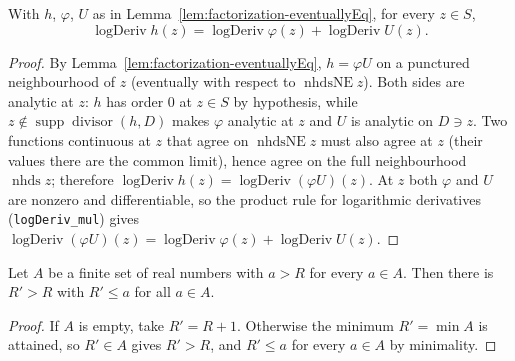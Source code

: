 \begin{lemma}
    \label{lem:factorization-logDeriv}
    \leanok
    With $h$, $\varphi$, $U$ as in
    Lemma~\ref{lem:factorization-eventuallyEq}, for every $z \in S$,
    \[
        \operatorname{logDeriv} h(z)
          = \operatorname{logDeriv}\varphi(z) + \operatorname{logDeriv} U(z).
    \]
\end{lemma}
\begin{proof}
    By Lemma~\ref{lem:factorization-eventuallyEq}, $h = \varphi U$ on a punctured
    neighbourhood of $z$ (eventually with respect to $\operatorname{nhdsNE} z$).
    Both sides are analytic at $z$: $h$ has order $0$ at $z \in S$ by hypothesis,
    while $z \notin \operatorname{supp}\operatorname{divisor}(h,D)$ makes $\varphi$
    analytic at $z$ and $U$ is analytic on $D \ni z$. Two functions continuous at
    $z$ that agree on $\operatorname{nhdsNE} z$ must also agree at $z$ (their values
    there are the common limit), hence agree on the full neighbourhood
    $\operatorname{nhds} z$; therefore
    $\operatorname{logDeriv} h(z) = \operatorname{logDeriv}(\varphi U)(z)$. At $z$
    both $\varphi$ and $U$ are nonzero and differentiable, so the product rule for
    logarithmic derivatives (\texttt{logDeriv\_mul}) gives
    $\operatorname{logDeriv}(\varphi U)(z) = \operatorname{logDeriv}\varphi(z) +
    \operatorname{logDeriv} U(z)$.
\end{proof}

\begin{lemma}
    \label{lem:exists-lt-of-finite}
    \leanok
    Let $A$ be a finite set of real numbers with $a > R$ for every $a \in A$.
    Then there is $R' > R$ with $R' \le a$ for all $a \in A$.
\end{lemma}
\begin{proof}
    If $A$ is empty, take $R' = R + 1$. Otherwise the minimum $R' = \min A$ is
    attained, so $R' \in A$ gives $R' > R$, and $R' \le a$ for every $a \in A$ by
    minimality.
\end{proof}

